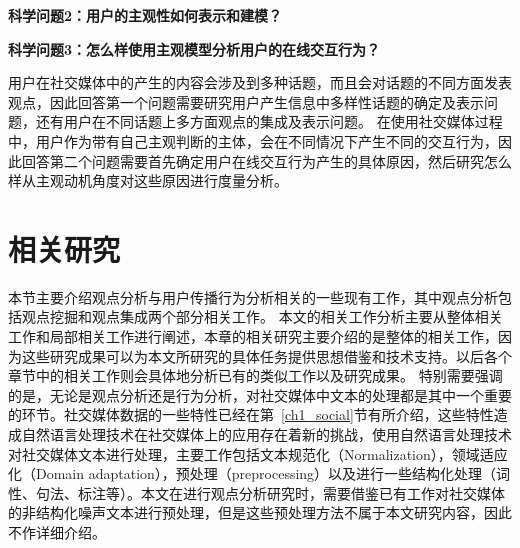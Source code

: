\textbf{科学问题2：用户的主观性如何表示和建模？}

\textbf{科学问题3：怎么样使用主观模型分析用户的在线交互行为？}

用户在社交媒体中的产生的内容会涉及到多种话题，而且会对话题的不同方面发表观点，因此回答第一个问题需要研究用户产生信息中多样性话题的确定及表示问题，还有用户在不同话题上多方面观点的集成及表示问题。
在使用社交媒体过程中，用户作为带有自己主观判断的主体，会在不同情况下产生不同的交互行为，因此回答第二个问题需要首先确定用户在线交互行为产生的具体原因，然后研究怎么样从主观动机角度对这些原因进行度量分析。

\section{相关研究}
本节主要介绍观点分析与用户传播行为分析相关的一些现有工作，其中观点分析包括观点挖掘和观点集成两个部分相关工作。
本文的相关工作分析主要从整体相关工作和局部相关工作进行阐述，本章的相关研究主要介绍的是整体的相关工作，因为这些研究成果可以为本文所研究的具体任务提供思想借鉴和技术支持。以后各个章节中的相关工作则会具体地分析已有的类似工作以及研究成果。
特别需要强调的是，无论是观点分析还是行为分析，对社交媒体中文本的处理都是其中一个重要的环节。社交媒体数据的一些特性已经在第~\ref{ch1_social}节有所介绍，这些特性造成自然语言处理技术在社交媒体上的应用存在着新的挑战，使用自然语言处理技术对社交媒体文本进行处理，主要工作包括文本规范化（Normalization），领域适应化（Domain adaptation），预处理（preprocessing）以及进行一些结构化处理（词性、句法、标注等）。本文在进行观点分析研究时，需要借鉴已有工作对社交媒体的非结构化噪声文本进行预处理，但是这些预处理方法不属于本文研究内容，因此不作详细介绍。


